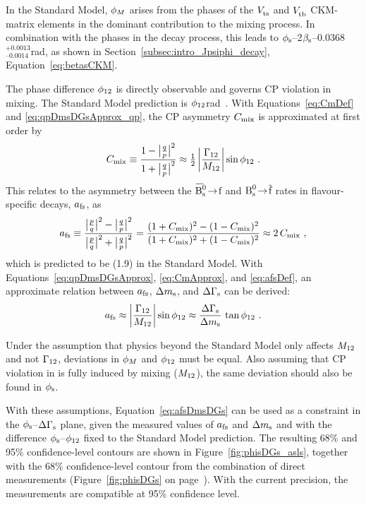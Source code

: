 In the Standard Model, $\phi_M$ arises from the phases of the $\Vts$ and $\Vtb$ CKM-matrix elements in the dominant contribution to the
mixing process. In combination with the phases in the \BstoJpsiKK{} decay process, this leads to
$\phi_\text{s}$\textapprox--2$\beta_\text{s}$\texteq--0.0368$^\text{+0.0013}_\text{--0.0014}$\unitsp{}rad, as shown in
Section~\ref{subsec:intro_Jpsiphi_decay}, Equation~\ref{eq:betasCKM}.

The phase difference $\phi_\text{12}$ is directly observable and governs CP violation in mixing. The Standard Model prediction is
$\phi_\text{12}$\unitsp{}rad~\cite{Lenz:2006hd,*Lenz:2011ti}. With Equations~\ref{eq:CmDef} and
\ref{eq:qpDmsDGsApprox_qp}, the CP asymmetry $C_\text{mix}$ is approximated at first order by
\begin{equation}
  \label{eq:CmApprox}
  C_\text{mix} \equiv \frac{1-\big|\tfrac{q}{p}\big|^2}{1+\big|\tfrac{q}{p}\big|^2} \approx \tfrac{1}{2}\left|\frac{\Gamma_\text{12}}{M_\text{12}}\right|\sin\phi_\text{12} \ .
\end{equation}
This relates to the asymmetry between the $\Bsbartof$ and $\text{B}_\text{s}^\text{0}\!\to\!\overline{\text{f}}$ rates in flavour-specific decays, $a_\text{fs}$, as
\begin{equation}
  \label{eq:afsDef}
  a_\text{fs} \equiv \frac{\big|\tfrac{p}{q}\big|^2-\big|\tfrac{q}{p}\big|^2}{\big|\tfrac{p}{q}\big|^2+\big|\tfrac{q}{p}\big|^2} = \frac{(1+C_\text{mix})^2 - (1-C_\text{mix})^2}{(1+C_\text{mix})^2 + (1-C_\text{mix})^2} \approx 2\,C_\text{mix}
  \ ,
\end{equation}
which is predicted to be (1.9) in the Standard Model. With Equations~\ref{eq:qpDmsDGsApprox}, \ref{eq:CmApprox},
and \ref{eq:afsDef}, an approximate relation between $a_\text{fs}$, $\Delta m_\text{s}$, and $\Delta\Gamma_\text{s}$ can be derived:
\begin{equation}
  \label{eq:afsDmsDGs}
  a_\text{fs} \approx \left|\frac{\Gamma_\text{12}}{M_\text{12}}\right|\sin\phi_\text{12} \approx \frac{\Delta\Gamma_\text{s}}{\Delta m_\text{s}}\,\tan\phi_\text{12} \ .
\end{equation}

Under the assumption that physics beyond the Standard Model only affects $M_\text{12}$ and not $\Gamma_\text{12}$, deviations in $\phi_M$ and $\phi_\text{12}$ must
be equal. Also assuming that CP violation in \BstoJpsiKK{} is fully induced by mixing ($M_\text{12}$), the same deviation should also be found in
$\phi_\text{s}$.

With these assumptions, Equation~\ref{eq:afsDmsDGs} can be used as a constraint in the $\phi_\text{s}$--$\Delta\Gamma_\text{s}$ plane, given the measured
values of $a_\text{fs}$ and $\Delta m_\text{s}$ and with the difference $\phi_\text{s}$--$\phi_\text{12}$ fixed to the Standard Model prediction. The resulting 68\% and 95\%
confidence-level contours are shown in Figure~\ref{fig:phisDGs_asls}, together with the 68\% confidence-level contour from the combination
of direct measurements (Figure~\ref{fig:phisDGs} on page~\pageref{fig:phisDGs}). With the current precision, the measurements are
compatible at 95\% confidence level.

